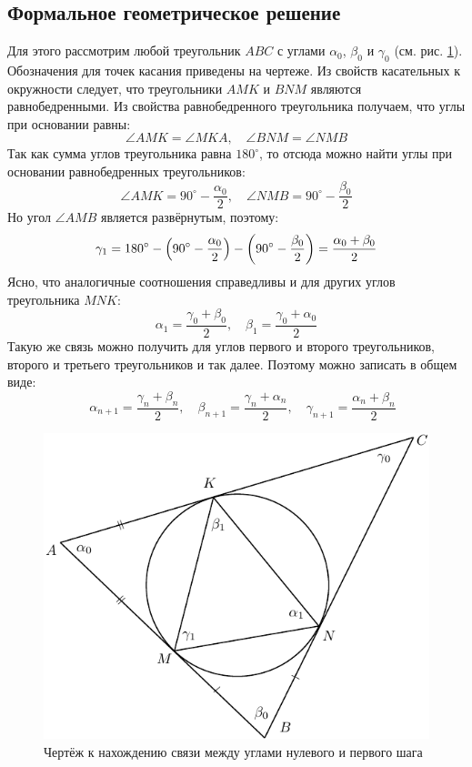 \documentclass[a4paper,9pt,russian]{article}
\begin{document}
\subsection{Формальное геометрическое решение}
 Для этого рассмотрим любой треугольник $ABC$ с углами $\alpha_0$, $\beta_0$ и $\gamma_0$ (см. рис. \ref{fig:7}). Обозначения для точек касания приведены на чертеже. Из свойств касательных к окружности следует, что треугольники $AMK$ и $BNM$ являются равнобедренными. Из свойства равнобедренного треугольника получаем, что углы при основании равны:
\begin{equation}
	\angle AMK = \angle MKA, \quad \angle BNM = \angle NMB
\end{equation}
Так как сумма углов треугольника равна $180^{\circ}$, то отсюда можно найти углы при основании равнобедренных треугольников:
\begin{equation}
	\angle AMK = 90^{\circ} - \dfrac{\alpha_0}{2}, \quad \angle NMB = 90^{\circ} - \dfrac{\beta_0}{2}
\end{equation}
Но угол $\angle AMB$ является развёрнутым, поэтому:
\begin{equation}\label{eq:25}
	\gamma_1 = 180^{\circ} - \qty(90^{\circ} - \dfrac{\alpha_0}{2}) - \qty(90^{\circ} - \dfrac{\beta_0}{2}) = \dfrac{\alpha_0 + \beta_0}{2}
\end{equation}
Ясно, что аналогичные соотношения справедливы и для других углов треугольника $MNK$:
\begin{equation}\label{eq:26}
	\alpha_1 = \dfrac{\gamma_0 + \beta_0}{2}, \quad \beta_1 = \dfrac{\gamma_0 + \alpha_0}{2}
\end{equation}
Такую же связь можно получить для углов первого и второго треугольников, второго и третьего треугольников и так далее. Поэтому можно записать в общем виде:
\begin{equation}
	\quad \alpha_{n+1} = \dfrac{\gamma_n + \beta_n}{2}, \quad \beta_{n+1} = \dfrac{\gamma_n + \alpha_n}{2}, \quad \gamma_{n+1} = \dfrac{\alpha_n + \beta_n}{2}
\end{equation}
\begin{figure}[h]
	\centering
	\includegraphics[scale = 1]{first6.pdf}
	\caption{Чертёж к нахождению связи между углами нулевого и первого шага}
	\label{fig:7}
\end{figure}
\end{document}
